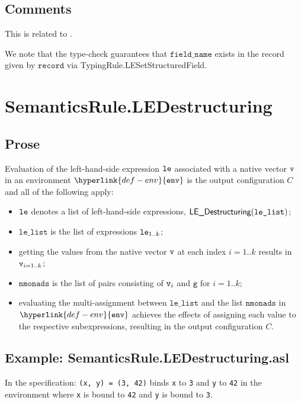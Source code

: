 \documentclass{book}
\newcommand\env[0]{\hyperlink{def-env}{\texttt{env}}}
\newcommand\vg[0]{\texttt{g}}
\newcommand\fieldname[0]{\texttt{field\_name}}
\newcommand\record[0]{\texttt{record}}
\newcommand\vlelist[0]{\texttt{le\_list}}
\newcommand\nmonads[0]{\texttt{nmonads}}
\begin{document}
\subsection{Comments}
  This is related to .

  We note that the type-check guarantees that $\fieldname$ exists in the record given by $\record$
  via TypingRule.LESetStructuredField.

\section{SemanticsRule.LEDestructuring \label{sec:SemanticsRule.LEDestructuring}}
    \subsection{Prose}
    Evaluation of the left-hand-side expression $\texttt{le}$ associated with a
    native vector $\texttt{v}$ in an environment $\env$ is the output configuration $C$
    and all of the following apply:
    \begin{itemize}
    \item $\texttt{le}$ denotes a list of left-hand-side expressions, $\LEDestructuring(\vlelist)$;
    \item $\vlelist$ is the list of expressions $\texttt{le}_{1..k}$;
    \item getting the values from the native vector $\texttt{v}$ at each index $i=1..k$
    results in $\texttt{v}_{i=1..k}$;
    \item $\nmonads$ is the list of pairs consisting of $\texttt{v}_i$ and $\vg$ for $i=1..k$;
    \item evaluating the multi-assignment between $\vlelist$ and the list $\nmonads$
    in $\env$ achieves the effects of assigning each value to the respective
    subexpressions, resulting in the output configuration $C$.
    \end{itemize}

    \subsection{Example: SemanticsRule.LEDestructuring.asl}
    In the specification:
    \texttt{(x, y) = (3, 42)} binds \texttt{x} to \texttt{3} and \texttt{y} to \texttt{42} in the environment where \texttt{x} is bound to \texttt{42} and \texttt{y} is bound to \texttt{3}.

\end{document}
